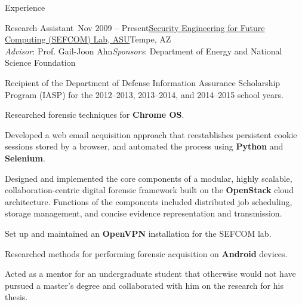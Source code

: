 \documentclass{resume} %
\begin{document}
\begin{rSection}{Experience}


\begin{rSubsection}{Research Assistant~}{Nov 2009 -- Present}{\href{http://sefcom.asu.edu/}{Security Engineering for Future Computing (SEFCOM) Lab, ASU}}{Tempe, AZ\\{\textnormal{\textit{Advisor}: Prof. Gail-Joon Ahn\hfill \textit{Sponsors}: Department of Energy and National Science Foundation}}}
	
	\item Recipient of the Department of Defense Information Assurance Scholarship Program (IASP) for the 2012--2013, 2013--2014, and 2014--2015 school years.
	
	\item Researched forensic techniques for \textbf{Chrome OS}.
	
	\item Developed a web email acquisition approach that reestablishes persistent cookie sessions stored by a browser, and automated the process using \textbf{Python} and \textbf{Selenium}.
	
	\item Designed and implemented the core components of a modular, highly scalable, collaboration-centric digital forensic framework built on the \textbf{OpenStack} cloud architecture. Functions of the components included distributed job scheduling, storage management, and concise evidence representation and transmission.
	
	\item Set up and maintained an \textbf{OpenVPN} installation for the SEFCOM lab.
		
	\item Researched methods for performing forensic acquisition on \textbf{Android} devices.
	
	\item Acted as a mentor for an undergraduate student that otherwise would not have pursued a master's degree and collaborated with him on the research for his thesis.
	
\end{rSubsection}


\end{rSection}
\end{document}

